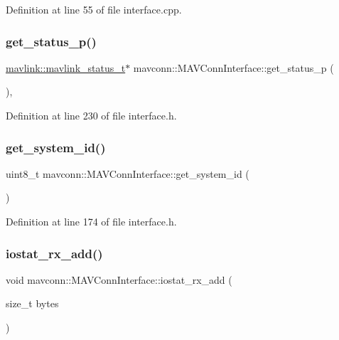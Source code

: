 Definition at line 55 of file interface.\+cpp.

\mbox{\label{group__mavconn_ga2bb422475644d340b8116f7d67253dde}} 
\subsubsection{\texorpdfstring{get\_status\_p()}{get\_status\_p()}}
{\footnotesize\ttfamily \mbox{\hyperlink{include__v2_80_2mavlink__types_8h_aec6f7af3879252822d8fb108e97aafc2}{mavlink\+::mavlink\+\_\+status\+\_\+t}}$\ast$ mavconn\+::\+M\+A\+V\+Conn\+Interface\+::get\+\_\+status\+\_\+p (\begin{DoxyParamCaption}{ }\end{DoxyParamCaption})\hspace{0.3cm}{\ttfamily [inline]}, {\ttfamily [protected]}}



Definition at line 230 of file interface.\+h.

\mbox{\label{group__mavconn_gac09eda5df4b4b82823429d9af6dddd44}} 
\subsubsection{\texorpdfstring{get\_system\_id()}{get\_system\_id()}}
{\footnotesize\ttfamily uint8\+\_\+t mavconn\+::\+M\+A\+V\+Conn\+Interface\+::get\+\_\+system\+\_\+id (\begin{DoxyParamCaption}{ }\end{DoxyParamCaption})\hspace{0.3cm}{\ttfamily [inline]}}



Definition at line 174 of file interface.\+h.

\mbox{\label{group__mavconn_gab045ff5b6e55b96630f00e131e4d2c16}} 
\subsubsection{\texorpdfstring{iostat\_rx\_add()}{iostat\_rx\_add()}}
{\footnotesize\ttfamily void mavconn\+::\+M\+A\+V\+Conn\+Interface\+::iostat\+\_\+rx\+\_\+add (\begin{DoxyParamCaption}\item[{size\+\_\+t}]{bytes }\end{DoxyParamCaption})\hspace{0.3cm}{\ttfamily [protected]}}




